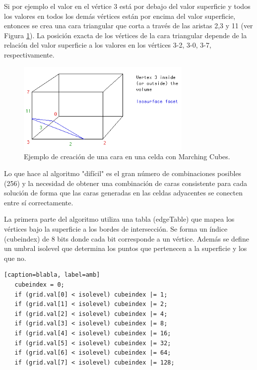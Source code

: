 \documentclass[12pt]{article}
\begin{document}
Si por ejemplo el valor en el vértice 3 está por debajo del valor superficie y todos los valores en todos los demás vértices están por encima del valor superficie, entonces se crea una cara triangular que corta a través de las aristas 2,3 y 11 (ver Figura \ref{mc2}). La posición exacta de los vértices de la cara triangular depende de la relación del valor superficie a los valores en los vértices 3-2, 3-0, 3-7, respectivamente.
\begin{figure}[h!]
\includegraphics[width=0.75\textwidth,center]{marchingcubes2.png}
\caption{Ejemplo de creación de una cara en una celda con Marching Cubes.}
\label{mc2}
\end{figure}
Lo que hace al algoritmo "difícil" es el gran número de combinaciones posibles (256) y la necesidad de obtener una combinación de caras consistente para cada solución de forma que las caras generadas en las celdas adyacentes se conecten entre sí correctamente.

La primera parte del algoritmo utiliza una tabla (edgeTable) que mapea los vértices bajo la superficie a los bordes de intersección. Se forma un índice (cubeindex) de 8 bits donde cada bit corresponde a un vértice. Además se define un umbral isolevel que determina los puntos que pertenecen a la superficie y los que no.
\lstset{language=C}          %

\begin{lstlisting}[frame=single][caption=blabla, label=amb]
   cubeindex = 0;
   if (grid.val[0] < isolevel) cubeindex |= 1;
   if (grid.val[1] < isolevel) cubeindex |= 2;
   if (grid.val[2] < isolevel) cubeindex |= 4;
   if (grid.val[3] < isolevel) cubeindex |= 8;
   if (grid.val[4] < isolevel) cubeindex |= 16;
   if (grid.val[5] < isolevel) cubeindex |= 32;
   if (grid.val[6] < isolevel) cubeindex |= 64;
   if (grid.val[7] < isolevel) cubeindex |= 128;
\end{lstlisting}
\end{document}
